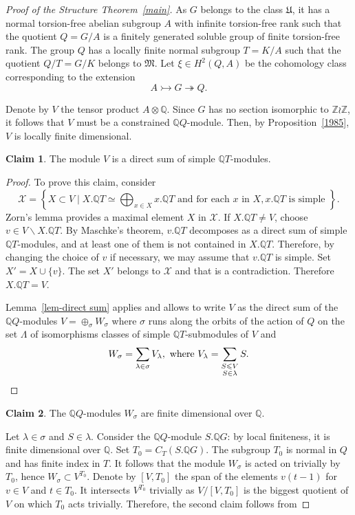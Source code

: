 \documentclass[11pt]{article}
\theoremstyle{definition}
\numberwithin{equation}{section}
\numberwithin{figure}{section}
\numberwithin{table}{section}
\newtheorem{claiml}{Claim}
\renewcommand{\setminus}{\smallsetminus}
\newcommand{\Q}{\mathbb{Q}}
\newcommand{\Z}{\mathbb{Z}}
\newcommand{\mono}{\rightarrowtail}
\newcommand{\epi}{\twoheadrightarrow}
\begin{document}
\begin{proof}[{Proof of the Structure Theorem~\ref{main}}]
As $G$ belongs to the class $\mathfrak{U}$, it has a normal torsion-free abelian subgroup $A$ with infinite torsion-free rank such that the quotient $Q= G/A$ is a finitely generated soluble group of finite torsion-free rank. The group $Q$ has a locally finite normal subgroup $T = K/A$ such that the quotient $Q/T = G/K$ belongs to $\mathfrak{M}$. Let $\xi \in H^2(Q, A)$ be the cohomology class corresponding to the extension
\[
A \mono G \epi Q.
\]

Denote by $V$ the tensor product $A \otimes \Q$. Since $G$ has no section isomorphic to $\Z \wr \Z$, it follows that $V$ must be a constrained $\Q Q$-module. Then, by Proposition~\ref{1985}, $V$ is locally finite dimensional.
\begin{claiml}
The module $V$ is a direct sum of simple $\Q T$-modules.
\end{claiml}
\begin{proof}
To prove this claim, consider
\[
\mathcal{X} = \left\{ X \subset V \mid X.\Q T \simeq \bigoplus_{x\in X} x.\Q T \text{ and for each } x \text{ in } X, x.\Q T \text{ is simple } \right\}.
\]
Zorn's lemma provides a maximal element $X$ in $\mathcal{X}$. If $X.\Q T\neq V$, choose $v\in V\setminus X.\Q T$. By Maschke's theorem, $v.\Q T$ decomposes as a direct sum of simple $\Q T$-modules, and at least one of them is not contained in $X.\Q T$. Therefore, by changing the choice of $v$ if necessary, we may assume that $v.\Q T$ is simple. Set $X' = X \cup \{v\}$. The set $X'$ belongs to $\mathcal X$ and that is a contradiction. Therefore $X.\Q T = V$.

\medskip

Lemma~\ref{lem-direct sum} applies and allows to write $V$ as the direct sum of the $\Q Q$-modules $V = \oplus_\sigma W_\sigma$ where $\sigma$ runs along the orbits of the action of $Q$ on the set $\Lambda$ of isomorphisms classes of simple $\Q T$-submodules of $V$ and
\[
W_\sigma = \sum_{\lambda \in \sigma} V_\lambda, \text{ where } V_\lambda = \sum_{\substack{S \leqslant V \\ S\in \lambda}} S. \qedhere
\]
\end{proof}


\begin{claiml}
The $\Q Q$-modules $W_\sigma$ are finite dimensional over $\Q$.
\end{claiml}

Let $\lambda \in \sigma$ and $S\in \lambda$. Consider the $\Q Q$-module $S.\Q G$: by local finiteness, it is finite dimensional over $\Q$. Set $T_0 = C_T(S.\Q G)$. The subgroup $T_0$ is normal in $Q$ and has finite index in $T$. It follows that the module $W_\sigma$ is acted on trivially by $T_0$, hence $W_\sigma \subset V^{T_0}$. Denote by $[V, T_0]$ the span of the elements $v(t-1)$ for $v \in V$ and $t \in T_0$. It intersects $V^{T_0}$ trivially as $V/[V, T_0]$ is the biggest quotient of $V$ on which $T_0$ acts trivially. Therefore, the second claim follows from



\end{proof}
\end{document}
